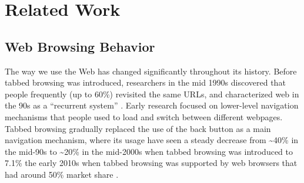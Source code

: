 
\section{Related Work}

\subsection{Web Browsing Behavior}

The way we use the Web has changed significantly throughout its history. Before tabbed browsing was introduced, researchers in the mid 1990s discovered that people frequently (up to 60\%) revisited the same URLs, and characterized web in the 90s as a ``recurrent system'' \cite{tauscher1997people}. Early research focused on lower-level navigation mechanisms that people used to load and switch between different webpages. Tabbed browsing gradually replaced the use of the back button as a main navigation mechanism, where its usage have seen a steady decrease from \textasciitilde40\% in the mid-90s \cite{catledge1995characterizing,tauscher1997people} to \textasciitilde20\% in the mid-2000s when tabbed browsing was introduced \cite{weinreich2006off,weinreich2008not} to 7.1\% the early 2010s when tabbed browsing was supported by web browsers that had around 50\% market share \cite{Dubroy:2010:STB:1753326.1753426}.

